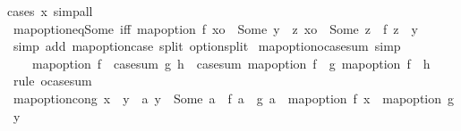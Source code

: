 \begin{isabellebody}
{\isacharparenleft}{\kern0pt}cases\ x{\isacharparenright}{\kern0pt}\ simp{\isacharunderscore}{\kern0pt}all%
\endisatagproof
{\isafoldproof}%
%
\isadelimproof
\isanewline
%
\endisadelimproof
\isanewline
{}\isamarkupfalse%
\ map{\isacharunderscore}{\kern0pt}option{\isacharunderscore}{\kern0pt}eq{\isacharunderscore}{\kern0pt}Some\ {\isacharbrackleft}{\kern0pt}iff{\isacharbrackright}{\kern0pt}{\isacharcolon}{\kern0pt}\ {\isachardoublequoteopen}{\isacharparenleft}{\kern0pt}map{\isacharunderscore}{\kern0pt}option\ f\ xo\ {\isacharequal}{\kern0pt}\ Some\ y{\isacharparenright}{\kern0pt}\ {\isacharequal}{\kern0pt}\ {\isacharparenleft}{\kern0pt}{\isasymexists}z{\isachardot}{\kern0pt}\ xo\ {\isacharequal}{\kern0pt}\ Some\ z\ {\isasymand}\ f\ z\ {\isacharequal}{\kern0pt}\ y{\isacharparenright}{\kern0pt}{\isachardoublequoteclose}\isanewline
%
\isadelimproof
\ \ %
\endisadelimproof
%
\isatagproof
{}\isamarkupfalse%
\ {\isacharparenleft}{\kern0pt}simp\ add{\isacharcolon}{\kern0pt}\ map{\isacharunderscore}{\kern0pt}option{\isacharunderscore}{\kern0pt}case\ split{\isacharcolon}{\kern0pt}\ option{\isachardot}{\kern0pt}split{\isacharparenright}{\kern0pt}%
\endisatagproof
{\isafoldproof}%
%
\isadelimproof
\isanewline
%
\endisadelimproof
\isanewline
{}\isamarkupfalse%
\ map{\isacharunderscore}{\kern0pt}option{\isacharunderscore}{\kern0pt}o{\isacharunderscore}{\kern0pt}case{\isacharunderscore}{\kern0pt}sum\ {\isacharbrackleft}{\kern0pt}simp{\isacharbrackright}{\kern0pt}{\isacharcolon}{\kern0pt}\isanewline
\ \ \ \ {\isachardoublequoteopen}map{\isacharunderscore}{\kern0pt}option\ f\ {\isasymcirc}\ case{\isacharunderscore}{\kern0pt}sum\ g\ h\ {\isacharequal}{\kern0pt}\ case{\isacharunderscore}{\kern0pt}sum\ {\isacharparenleft}{\kern0pt}map{\isacharunderscore}{\kern0pt}option\ f\ {\isasymcirc}\ g{\isacharparenright}{\kern0pt}\ {\isacharparenleft}{\kern0pt}map{\isacharunderscore}{\kern0pt}option\ f\ {\isasymcirc}\ h{\isacharparenright}{\kern0pt}{\isachardoublequoteclose}\isanewline
%
\isadelimproof
\ \ %
\endisadelimproof
%
\isatagproof
{}\isamarkupfalse%
\ {\isacharparenleft}{\kern0pt}rule\ o{\isacharunderscore}{\kern0pt}case{\isacharunderscore}{\kern0pt}sum{\isacharparenright}{\kern0pt}%
\endisatagproof
{\isafoldproof}%
%
\isadelimproof
\isanewline
%
\endisadelimproof
\isanewline
{}\isamarkupfalse%
\ map{\isacharunderscore}{\kern0pt}option{\isacharunderscore}{\kern0pt}cong{\isacharcolon}{\kern0pt}\ {\isachardoublequoteopen}x\ {\isacharequal}{\kern0pt}\ y\ {\isasymLongrightarrow}\ {\isacharparenleft}{\kern0pt}{\isasymAnd}a{\isachardot}{\kern0pt}\ y\ {\isacharequal}{\kern0pt}\ Some\ a\ {\isasymLongrightarrow}\ f\ a\ {\isacharequal}{\kern0pt}\ g\ a{\isacharparenright}{\kern0pt}\ {\isasymLongrightarrow}\ map{\isacharunderscore}{\kern0pt}option\ f\ x\ {\isacharequal}{\kern0pt}\ map{\isacharunderscore}{\kern0pt}option\ g\ y{\isachardoublequoteclose}\isanewline

\end{isabellebody}
